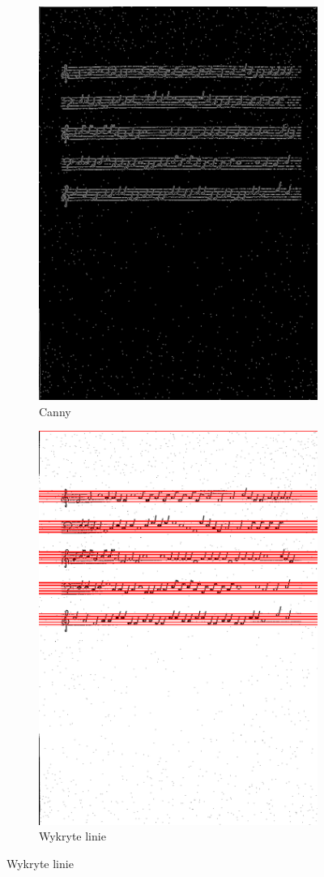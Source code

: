 \documentclass[11pt]{article}
\begin{document}
\begin{figure}[H]
    \centering
    \begin{subfigure}{.5\textwidth}
        \centering
        \graphicspath{ {staffs/} }
        \includegraphics[width=.7\linewidth]{staffs4_canny.png}
        \caption{Canny}
        \label{fig:sub1}
    \end{subfigure}%
    \begin{subfigure}{.5\textwidth}
        \centering
        \graphicspath{ {staffs/} }
        \includegraphics[width=.7\linewidth]{staffs4_lines.png}
        \caption{Wykryte linie}
        \label{fig:sub2}
    \end{subfigure}
    \label{fig:test}
\end{figure}
\end{document}
